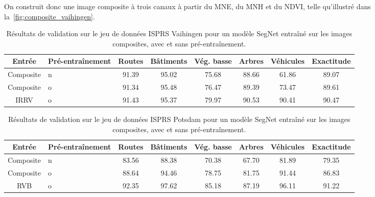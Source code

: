 On construit donc une image composite à trois canaux à partir du \gls{MNE}, du \gls{MNH} et du \gls{NDVI}, telle qu'illustré dans la~\cref{fig:composite_vaihingen}.



\begin{table}[t]
  \begin{tabularx}{\textwidth}{c Y c c c c c c}
    \toprule
    Entrée & Pré-entraînement & Routes & Bâtiments & Vég. basse & Arbres & Véhicules & Exactitude\\
    \midrule
    Composite & n & 91.39 & 95.02 & 75.68 & 88.66 & 61.86 & 89.07\\
    Composite & o & 91.34 & 95.48 & 76.47 & 89.39 & 73.47 & 89.61\\
    \gls{IRRV}& o & 91.43 & 95.37 & 79.97 & 90.53 & 90.41 & 90.47\\
    \bottomrule
  \end{tabularx}
  \caption{Résultats de validation sur le jeu de données \gls{ISPRS} Vaihingen pour un modèle SegNet entraîné sur les images composites, avec et sans pré-entraînement.}
  \label{tab:composite_vaihingen}
\end{table}

\begin{table}[t]
  \begin{tabularx}{\textwidth}{c Y c c c c c c}
    \toprule
    Entrée & Pré-entraînement & Routes & Bâtiments & Vég. basse & Arbres & Véhicules & Exactitude\\
    \midrule
    Composite & n & 83.56 & 88.38 & 70.38 & 67.70 & 81.89 & 79.35\\
    Composite & o & 88.64 & 94.46 & 78.75 & 81.75 & 91.44 & 86.83\\
    \gls{RVB} & o & 92.35 & 97.62 & 85.18 & 87.19 & 96.11 & 91.22\\
    \bottomrule
  \end{tabularx}
  \caption{Résultats de validation sur le jeu de données \gls{ISPRS} Potsdam pour un modèle SegNet entraîné sur les images composites, avec et sans pré-entraînement.}
  \label{tab:composite_vaihingen}
\end{table}

